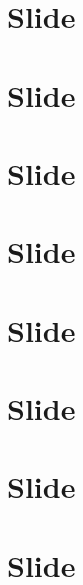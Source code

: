 \documentclass[a4paper, 12pt]{article}
\begin{document}
	\section{Slide}
	\section{Slide}
	\section{Slide}
	\section{Slide}
	\section{Slide}
	\section{Slide}
	\section{Slide}
	\section{Slide}
\end{document}
